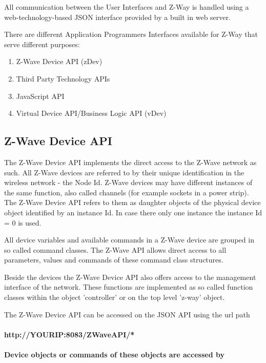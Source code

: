 All communication between the User Interfaces and Z-Way is handled using a 
web-technology-based  JSON interface provided by a built in web server.

There are different Application Programmers Interfaces available for Z-Way that serve 
different purposes:
\begin{enumerate}
\item Z-Wave Device API (zDev)
\item Third Party Technology APIs
\item JavaScript API
\item Virtual Device API/Business Logic API (vDev)
\end{enumerate}

\subsection{Z-Wave Device API}

The Z-Wave Device API implements the direct access to the Z-Wave network as such.
All Z-Wave devices are referred to by their unique identification in the wireless network - 
the Node Id. Z-Wave devices may have different instances of the same function, also 
called channels (for example sockets in a power strip). The Z-Wave Device API refers to them as daughter objects of the 
physical device object identified by an instance Id. In case there only one instance the 
instance Id = 0  is used.

All device variables and available commands in a Z-Wave device are grouped in so called
command classes. The Z-Wave API allows direct access to all parameters, values and 
commands of these command class structures.

Beside the devices the Z-Wave Device API also offers access to the management interface
of the network. These functions are implemented as so called function classes within 
the object 'controller' or on the top level 'z-way' object.

The Z-Wave Device API can be accessed on the JSON API using the url path 



\paragraph{http://YOURIP:8083/ZWaveAPI/*}
\paragraph{Device objects or commands of these objects are accessed by} 
